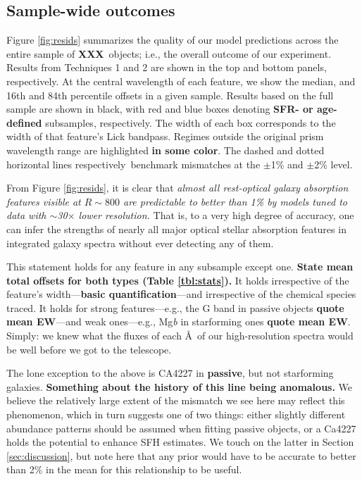 \documentclass[a4paper,fleqn,usenatbib]{mnras}
\newcommand{\resp}{respectively}
\newcommand{\bfr}{\bf\color{red}}
\newcommand{\ntot}{{\bfr XXX}} %
\begin{document}

\subsection{Sample-wide outcomes}

Figure \ref{fig:resids} summarizes the quality of our model predictions across the entire sample of
\ntot\ objects; i.e., the overall outcome of our experiment. Results from Techniques 1 and 2 are shown
in the top and bottom panels, \resp. At the central wavelength of each feature, we show the median, and
16th and 84th percentile offsets in a given sample. Results based on the full sample are shown in black, 
with red and blue boxes denoting {\bfr SFR- or age-defined} subsamples, \resp. The width of each box 
corresponds to the width of that feature's Lick bandpass. Regimes outside the original prism wavelength 
range are highlighted {\bfr in some color}. The dashed and dotted horizontal lines \resp\ benchmark 
mismatches at the $\pm$1\% and $\pm$2\% level.

From Figure \ref{fig:resids}, it is clear that {\it almost all rest-optical galaxy absorption features 
visible at $R\sim800$ are predictable to better than 1\% by models tuned to data with $\sim$30$\times$
lower resolution.} That is, to a very high degree of accuracy, one can infer the strengths of nearly all 
major optical stellar absorption features in integrated galaxy spectra without ever detecting any of them.

This statement holds for any feature in any subsample except one. 
{\bfr State mean total offsets for both types (Table \ref{tbl:stats}).} It holds irrespective of the feature's 
width---{\bfr basic quantification}---and irrespective of the chemical species traced. 
It holds for strong features---e.g., the G band in passive objects {\bfr quote mean
EW}---and weak ones---e.g., Mg{\it b} in starforming ones {\bfr quote mean EW}. Simply: we 
knew what the fluxes of each \AA\ of our high-resolution spectra would be well before we got to the
telescope.

The lone exception to the above is CA4227 in {\bfr passive}, but not starforming galaxies. {\bfr Something 
about the history of this line being anomalous.} We believe the relatively large extent of the mismatch we 
see here may reflect this phenomenon, which in turn suggests one of two things: either slightly different
abundance patterns should be assumed when fitting passive objects, or a Ca4227 holds the potential
to enhance SFH estimates. We touch on the latter in Section \ref{sec:discussion}, but note here that
any prior would have to be accurate to better than 2\% in the mean for this relationship to be useful.
\end{document}
